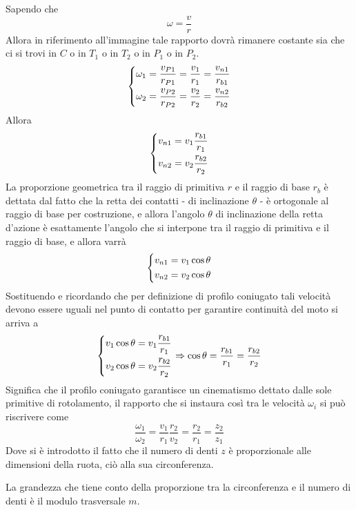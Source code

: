 \documentclass[a4paper, 15pt]{article}
\begin{document}
\begin{adjustwidth}{2in}{}
	 Sapendo che 
	 \[\omega = \dfrac{v}{r} \] 
	 Allora in riferimento all'immagine tale rapporto dovrà rimanere costante sia che ci si trovi in $C$ o in $T_1$ o in $T_2$ o in $P_1$ o in $P_2$.
	 \[\begin{dcases}
	 	\omega_1 = \dfrac{v_{P1}}{r_{P1}} = \dfrac{v_1}{r_1} = \dfrac{v_{n1}}{r_{b1}} \\
	 	\omega_2 = \dfrac{v_{P2}}{r_{P2}} = \dfrac{v_2}{r_2} = \dfrac{v_{n2}}{r_{b2}}
	 \end{dcases}\]
	 Allora 
	 \[\begin{dcases}
	 	v_{n1} = v_1\dfrac{r_{b1}}{r_1} \\
	 	v_{n2} = v_2\dfrac{r_{b2}}{r_2}
	 \end{dcases}\]
	 La proporzione geometrica tra il raggio di primitiva $r$ e il raggio di base $r_b$ è dettata dal fatto che la retta dei contatti - di inclinazione $\theta$ - è ortogonale al raggio di base per costruzione, e allora l'angolo $\theta$ di inclinazione della retta d'azione è esattamente l'angolo che si interpone tra il raggio di primitiva e il raggio di base, e allora varrà 
	 \[\begin{dcases}
	 	v_{n1} = v_1\cos\theta\\
	 	v_{n2} = v_2\cos\theta
	 \end{dcases}\]
\newpage
	 Sostituendo e ricordando che per definizione di profilo coniugato tali velocità devono essere uguali nel punto di contatto per garantire continuità del moto si arriva a
	  \[\begin{dcases}
	 	v_1\cos\theta = v_1\dfrac{r_{b1}}{r_1} \\
	 	v_2\cos\theta = v_2\dfrac{r_{b2}}{r_2}
	 \end{dcases} \Rightarrow \cos\theta = \dfrac{r_{b1}}{r_1} = \dfrac{r_{b2}}{r_2} \]
	 Significa che il profilo coniugato garantisce un cinematismo dettato dalle sole primitive di rotolamento, il  rapporto che si instaura così tra le velocità $\omega_i$ si può riscrivere come 
	 \[\dfrac{\omega_1}{\omega_2} = \dfrac{v_1}{r_1}\dfrac{r_2}{v_2} = \dfrac{r_2}{r_1} = \dfrac{z_2}{z_1}\]
	 Dove si è introdotto il fatto che il numero di denti $z$ è proporzionale alle dimensioni della ruota, ciò alla sua circonferenza. \newline 
	 
	 La grandezza che tiene conto della proporzione tra la circonferenza e il numero di denti è il modulo trasversale $m$. 
\end{adjustwidth}
\end{document}
